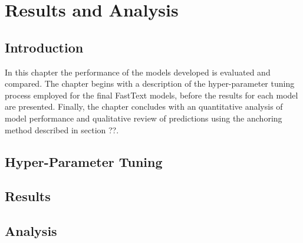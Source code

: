 \documentclass[Dissertation.tex]{subfiles}
\begin{document}
\chapter{Results and Analysis}
\section{Introduction}
In this chapter the performance of the models developed is evaluated and compared. The chapter begins with a description of the hyper-parameter tuning process employed for the final FastText models, before the results for each model are presented. Finally, the chapter concludes with an quantitative analysis of model performance and qualitative review of predictions using the anchoring method described in section ??.

\section{Hyper-Parameter Tuning}

\section{Results}

\section{Analysis}
\end{document}
